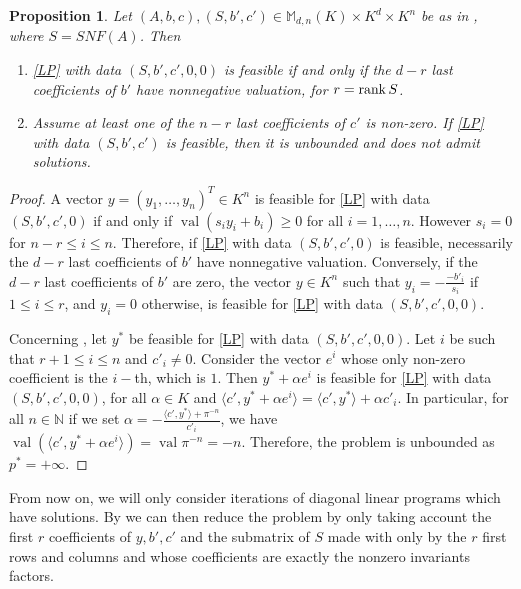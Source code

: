 \documentclass[a4paper,12pt]{article}
\newtheorem{proposition}[theorem]{Proposition}
\newcommand{\allmat}{\mathbb{M}} %
\newcommand{\corentin}[1]{{\color{red} #1}} %
\DeclareMathOperator{\val}{val}
\begin{document}
\begin{proposition}\label{prop:reduc}
  Let $(A,b,c), (S,b',c') \in \allmat_{d,n}(K) \times K^d \times K^n$ be as in , where
  $S=SNF(A)$. Then
  \begin{enumerate}
  \item \label{prop:reduc_it1}
    \eqref{LP} with data $(S,b',c',0,0)$ is feasible if and only if the $d-r$ last coefficients
    of $b'$ have nonnegative valuation, for $r = {\rm rank}\,S$.
  \item \label{prop:reduc_it2}
    Assume at least one of the $n-r$ last coefficients of $c'$ is non-zero. If \eqref{LP} with
    data $(S,b',c')$ is feasible, then it is unbounded and does not admit solutions.
  \end{enumerate}
\end{proposition}
\begin{proof}
  A vector $y = (y_1, \ldots, y_n)^T \in K^n$ is feasible for \eqref{LP} with data $(S,b',c',0)$
  if and only if $\val(s_i y_i + b_i) \geq 0$ for all $i = 1,\ldots,n$.
  However $s_i = 0$ for $n-r \leq i\leq n$. Therefore, if \eqref{LP} with data $(S,b',c',0)$ is feasible,
  necessarily the $d-r$ last coefficients of $b'$ have nonnegative valuation.
  Conversely, if the $d-r$ last coefficients of $b'$ are zero, the vector $y \in K^n$ such that
  $y_i = -\frac{-b'_i}{s_i}$ if $1 \leq i \leq r$, and $y_i =0$ otherwise, is feasible for \eqref{LP}
  with data $(S,b',c',0,0)$.

  Concerning , let $y^*$ be feasible for \eqref{LP} with data $(S,b',c',0,0)$.
  Let $i$ be such that $r+1 \leq i \leq n$ and $c'_i \neq 0$. Consider the vector $e^i$ whose only non-zero
  coefficient is the $i-$th, which is $1$. Then $y^* + \alpha e^i$ is feasible for \eqref{LP} with data $(S,b',c',0,0)$,
  for all $\alpha \in K$ and $\langle c', y^* + \alpha e^i\rangle = \langle c' , y^* \rangle + \alpha c'_i$.
  In particular, for all $n \in \mathbb{N}$ if we set $\alpha = -\frac{\langle c', y^* \rangle + \pi^{-n}}{c'_i}$, we have $\val \left( \langle c', y^* + \alpha e ^i \rangle\right) = \val \pi^{-n} = -n$. Therefore, the problem is unbounded as $p^* = + \infty$. 
\end{proof}

From now on, we will only consider iterations of diagonal linear programs which have solutions.
By  we can then reduce the problem by only taking account the first $r$ coefficients of
$y, b', c'$ and the submatrix of $S$ made with only by the $r$ first rows and columns and whose coefficients
are exactly the nonzero invariants factors.
\end{document}
